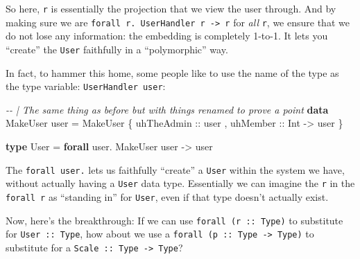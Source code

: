 \documentclass[]{article}
\newenvironment{Shaded}{}{}
\newcommand{\CommentTok}[1]{\textcolor[rgb]{0.38,0.63,0.69}{\textit{#1}}}
\newcommand{\DataTypeTok}[1]{\textcolor[rgb]{0.56,0.13,0.00}{#1}}
\newcommand{\KeywordTok}[1]{\textcolor[rgb]{0.00,0.44,0.13}{\textbf{#1}}}
\newcommand{\NormalTok}[1]{#1}
\newcommand{\OperatorTok}[1]{\textcolor[rgb]{0.40,0.40,0.40}{#1}}
\newcommand{\OtherTok}[1]{\textcolor[rgb]{0.00,0.44,0.13}{#1}}
\begin{document}
So here, \texttt{r} is essentially the projection that we view the user through.
And by making sure we are
\texttt{forall\ r.\ UserHandler\ r\ -\textgreater{}\ r} for \emph{all}
\texttt{r}, we ensure that we do not lose any information: the embedding is
completely 1-to-1. It lets you ``create'' the \texttt{User} faithfully in a
``polymorphic'' way.

In fact, to hammer this home, some people like to use the name of the type as
the type variable: \texttt{UserHandler\ user}:

\begin{Shaded}
\begin{Highlighting}[]
\CommentTok{{-}{-} | The same thing as before but with things renamed to prove a point}
\KeywordTok{data} \DataTypeTok{MakeUser}\NormalTok{ user }\OtherTok{=} \DataTypeTok{MakeUser}
\NormalTok{    \{}\OtherTok{ uhTheAdmin ::}\NormalTok{ user}
\NormalTok{    ,}\OtherTok{ uhMember ::} \DataTypeTok{Int} \OtherTok{{-}\textgreater{}}\NormalTok{ user}
\NormalTok{    \}}

\KeywordTok{type} \DataTypeTok{User\textquotesingle{}} \OtherTok{=} \KeywordTok{forall}\NormalTok{ user}\OperatorTok{.} \DataTypeTok{MakeUser}\NormalTok{ user }\OtherTok{{-}\textgreater{}}\NormalTok{ user}
\end{Highlighting}
\end{Shaded}

The \texttt{forall\ user.} lets us faithfully ``create'' a \texttt{User} within
the system we have, without actually having a \texttt{User} data type.
Essentially we can imagine the \texttt{r} in the \texttt{forall\ r} as
``standing in'' for \texttt{User}, even if that type doesn't actually exist.

Now, here's the breakthrough: If we can use \texttt{forall\ (r\ ::\ Type)} to
substitute for \texttt{User\ ::\ Type}, how about we use a
\texttt{forall\ (p\ ::\ Type\ -\textgreater{}\ Type)} to substitute for a
\texttt{Scale\ ::\ Type\ -\textgreater{}\ Type}?
\end{document}
